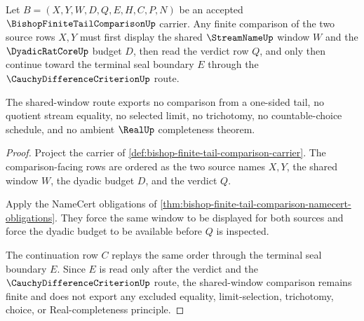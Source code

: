 \begin{theorem}
\label{thm:bishop-finite-tail-comparison-shared-window}
Let $B=(X,Y,W,D,Q,E,H,C,P,N)$ be an accepted $\BishopFiniteTailComparisonUp$ carrier. Any finite comparison of the two source rows $X,Y$ must first display the shared $\StreamNameUp$ window $W$ and the $\DyadicRatCoreUp$ budget $D$, then read the verdict row $Q$, and only then continue toward the terminal seal boundary $E$ through the $\CauchyDifferenceCriterionUp$ route.

The shared-window route exports no comparison from a one-sided tail, no quotient stream equality, no selected limit, no trichotomy, no countable-choice schedule, and no ambient $\RealUp$ completeness theorem.
\end{theorem}
\begin{proof}
Project the carrier of \autoref{def:bishop-finite-tail-comparison-carrier}. The comparison-facing rows are ordered as the two source names $X,Y$, the shared window $W$, the dyadic budget $D$, and the verdict $Q$.

Apply the NameCert obligations of \autoref{thm:bishop-finite-tail-comparison-namecert-obligations}. They force the same window to be displayed for both sources and force the dyadic budget to be available before $Q$ is inspected.

The continuation row $C$ replays the same order through the terminal seal boundary $E$. Since $E$ is read only after the verdict and the $\CauchyDifferenceCriterionUp$ route, the shared-window comparison remains finite and does not export any excluded equality, limit-selection, trichotomy, choice, or Real-completeness principle.
\end{proof}

